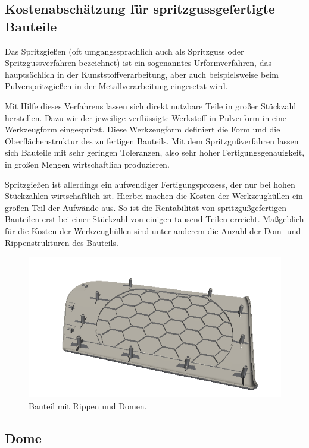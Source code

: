\subsection{Kostenabsch\"atzung f\"ur spritzgussgefertigte Bauteile}
\label{injection}

Das Spritzgie{\ss}en (oft umgangssprachlich auch als Spritzguss oder Spritzgussverfahren bezeichnet) ist ein sogenanntes Urformverfahren, das haupts\"achlich in der Kunststoffverarbeitung, aber auch beispielsweise beim Pulverspritzgie{\ss}en in der Metallverarbeitung eingesetzt wird.

Mit Hilfe dieses Verfahrens lassen sich direkt nutzbare Teile in gro{\ss}er St\"uckzahl herstellen. Dazu wir der jeweilige verfl\"ussigte  Werkstoff in Pulverform in eine Werkzeugform eingespritzt. Diese Werkzeugform definiert die Form und die Oberfl\"achenstruktur des zu fertigen Bauteils. Mit dem Spritzgu{\ss}verfahren lassen sich Bauteile mit sehr geringen Toleranzen, also sehr hoher Fertigungsgenauigkeit, in gro{\ss}en Mengen wirtschaftlich produzieren. 

Spritzgie{\ss}en ist allerdings ein aufwendiger Fertigungsprozess, der nur bei hohen St\"uckzahlen wirtschaftlich ist. Hierbei machen die Kosten der Werkzeugh\"ullen ein gro{\ss}en Teil der Aufw\"ande aus. So ist die Rentabilit\"at von spritzgu{\ss}gefertigen Bauteilen erst bei einer St\"uckzahl von einigen tausend Teilen erreicht. Ma{\ss}geblich f\"ur die Kosten der Werkzeugh\"ullen sind unter anderem die Anzahl der Dom- und Rippenstrukturen des Bauteils. 

\begin{figure}[tbp]
\centerline{
	\includegraphics[width=0.8\columnwidth]{graphics/domTeil1.png}
}
\caption{Bauteil mit Rippen und Domen.}
\label{triangulation}
\end{figure}

\subsection{Dome}
\label{dome}

